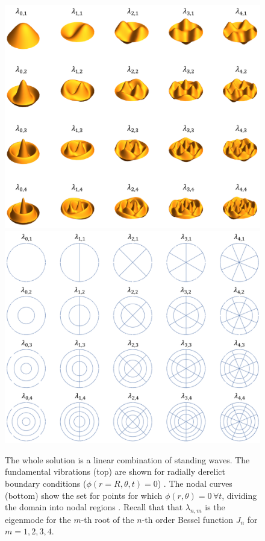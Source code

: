 \documentclass{homework}
\begin{document}
\begin{figure}
\begin{center}
    \includegraphics[scale=0.55]{media/Vibrations.png}
    \includegraphics[scale=0.55]{media/Nodes.png}
    \caption{The whole solution is a linear combination of standing waves. The fundamental vibrations (top) are shown for radially derelict boundary conditions ($\phi(r=R, \theta, t) = 0$) \cite{NDSU_notes}. The nodal curves (bottom) show the set for points for which $\phi(r, \theta) = 0 \, \forall t$, dividing the domain into nodal regions \cite{NDSU_notes}. Recall that that $\lambda_{n,m}$ is the eigenmode for the $m$-th root of the $n$-th order Bessel function $J_n$ for $m = 1, 2, 3, 4$.}
\end{center}
\end{figure}
\end{document}
